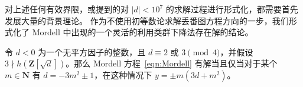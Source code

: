 \documentclass[sigplan,10pt,nonacm,
screen]{acmart} \settopmatter{printfolios=true,printccs=false,printacmref=false}
\newcommand{\ZZ}{\mathbf{Z}}
\newcommand{\NN}{\mathbf{N}}
\begin{document}




对上述任何有效界限，或提到的对 $|d|<10^7$ 的求解过程进行形式化，都需要首先发展大量的背景理论。
作为不使用初等数论求解丢番图方程方向的一步，我们形式化了 Mordell \cite[第 8 节]{mordell14} 中出现的一个灵活的利用类群下降法存在解的结论。

\begin{theorem}\label{thm:Mordell_basic}
    令 $d<0$ 为一个无平方因子的整数，且 $d\equiv 2 \text{ 或 } 3 \pmod{4}$，并假设 $3\nmid h(\ZZ[\sqrt{d}])$。那么 Mordell 方程~\eqref{eqn:Mordell} 有解当且仅当对于某个 $m\in \NN$ 有 $d=-3m^2 \pm 1$，在这种情况下 $y = \pm m (3d+m^2)$。
\end{theorem}
\end{document}

